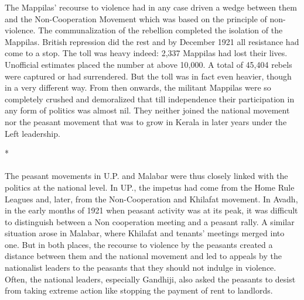 The Mappilas' recourse to violence had in any case driven a wedge between them and the Non-Cooperation Movement which was based on the principle of non-violence. The communalization of the rebellion completed the isolation of the Mappilas. British repression did the rest and by December 1921 all resistance had come to a stop. The toll was heavy indeed: 2,337 Mappilas had lost their lives. Unofficial estimates placed the number at above 10,000. A total of 45,404 rebels were captured or had surrendered. But the toll was in fact even heavier, though in a very different way. From then onwards, the militant Mappilas were so completely crushed and demoralized that till independence their participation in any form of politics was almost nil. They neither joined the national movement nor the peasant movement that was to grow in Kerala in later years under the Left leadership.

\begin{center}*\end{center}

\paragraph*{}


The peasant movements in U.P. and Malabar were thus closely linked with the politics at the national level. In UP., the impetus had come from the Home Rule Leagues and, later, from the Non-Cooperation and Khilafat movement. In Avadh, in the early months of 1921 when peasant activity was at its peak, it was difficult to distinguish between a Non cooperation meeting and a peasant rally. A similar situation arose in Malabar, where Khilafat and tenants' meetings merged into one. But in both places, the recourse to violence by the peasants created a distance between them and the national movement and led to appeals by the nationalist leaders to the peasants that they should not indulge in violence. Often, the national leaders, especially Gandhiji, also asked the peasants to desist from taking extreme action like stopping the payment of rent to landlords.

